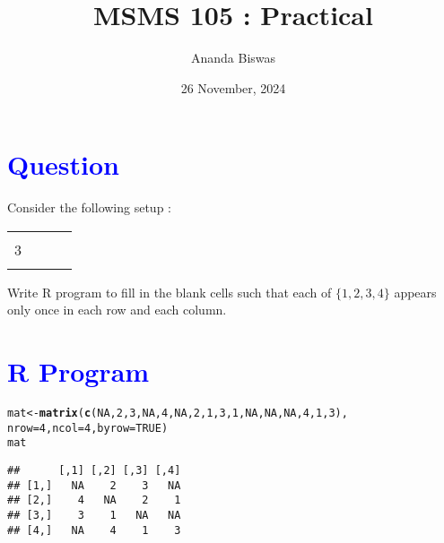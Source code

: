 \documentclass[11pt, a4paper]{article}\usepackage[]{graphicx}\usepackage[]{xcolor}
\title{MSMS 105 : Practical}
\author{Ananda Biswas}
\date{26 November, 2024}
\makeatletter
\newcommand{\hlnum}[1]{\textcolor[rgb]{0.686,0.059,0.569}{#1}}%
\newcommand{\hldef}[1]{\textcolor[rgb]{0.345,0.345,0.345}{#1}}%
\newcommand{\hlkwb}[1]{\textcolor[rgb]{0.69,0.353,0.396}{#1}}%
\newcommand{\hlkwc}[1]{\textcolor[rgb]{0.333,0.667,0.333}{#1}}%
\newcommand{\hlkwd}[1]{\textcolor[rgb]{0.737,0.353,0.396}{\textbf{#1}}}%
\newenvironment{kframe}{%
 \def\at@end@of@kframe{}%
 \ifinner\ifhmode%
  \def\at@end@of@kframe{\end{minipage}}%
  \begin{minipage}{\columnwidth}%
 \fi\fi%
 \def\FrameCommand##1{\hskip\@totalleftmargin \hskip-\fboxsep
 \colorbox{shadecolor}{##1}\hskip-\fboxsep
     \hskip-\linewidth \hskip-\@totalleftmargin \hskip\columnwidth}%
 \MakeFramed {\advance\hsize-\width
   \@totalleftmargin\z@ \linewidth\hsize
   \@setminipage}}%
 {\par\unskip\endMakeFramed%
 \at@end@of@kframe}
\newenvironment{knitrout}{}{} %
\makeatother
\begin{document}
\maketitle


\section*{\faArrowAltCircleRight[regular] \textcolor{blue}{Question}}

\hspace{1cm} Consider the following setup :

\begin{table}[!htbp]
\def\arraystretch{1.5}

\begin{center}
\begin{tabular}{|>{\centering}m{0.5cm}|>{\centering}m{0.5cm}|>{\centering}m{0.5cm}|>{\centering\arraybackslash}m{0.5cm}|}

\hline
 & 2 & 3 & \\
 
\hline

4 & & 2 & 1 \\

\hline

3 & 1 & & \\

\hline

& 4 & 1 & 3 \\

\hline
\end{tabular}
\end{center}
\end{table}


Write R program to fill in the blank cells such that each of $\{1, 2, 3, 4\}$ appears only once in each row and each column.


\section*{\faArrowAltCircleRight[regular] \textcolor{blue}{R Program}}

\begin{knitrout}
\color{fgcolor}\begin{kframe}
\begin{alltt}
\hldef{mat} \hlkwb{<-} \hlkwd{matrix}\hldef{(}\hlkwd{c}\hldef{(}\hlnum{NA}\hldef{,} \hlnum{2}\hldef{,} \hlnum{3}\hldef{,} \hlnum{NA}\hldef{,} \hlnum{4}\hldef{,} \hlnum{NA}\hldef{,} \hlnum{2}\hldef{,} \hlnum{1}\hldef{,} \hlnum{3}\hldef{,} \hlnum{1}\hldef{,} \hlnum{NA}\hldef{,} \hlnum{NA}\hldef{,} \hlnum{NA}\hldef{,} \hlnum{4}\hldef{,} \hlnum{1}\hldef{,} \hlnum{3}\hldef{),}
              \hlkwc{nrow} \hldef{=} \hlnum{4}\hldef{,} \hlkwc{ncol} \hldef{=} \hlnum{4}\hldef{,} \hlkwc{byrow} \hldef{=} \hlnum{TRUE}\hldef{)}
\hldef{mat}
\end{alltt}
\begin{verbatim}
##      [,1] [,2] [,3] [,4]
## [1,]   NA    2    3   NA
## [2,]    4   NA    2    1
## [3,]    3    1   NA   NA
## [4,]   NA    4    1    3
\end{verbatim}
\end{kframe}
\end{knitrout}
\end{document}
